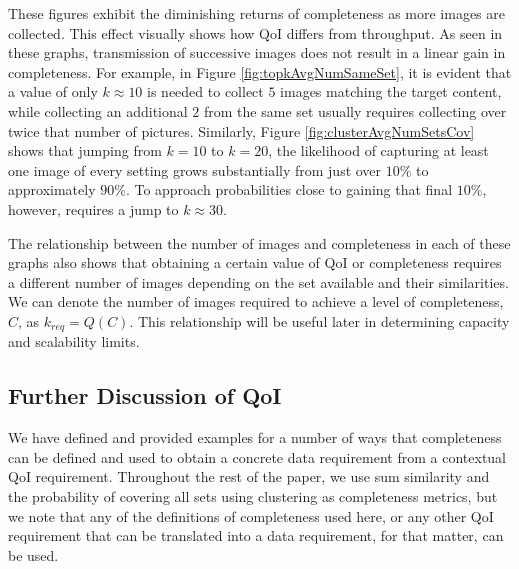These figures exhibit the diminishing returns of completeness as more images are collected.  This effect visually shows how QoI differs from throughput.  As seen in these graphs, transmission of successive images does not result in a linear gain in completeness.  For example, in Figure \ref{fig:topkAvgNumSameSet}, it is evident that a value of only $k \approx 10$ is needed to collect $5$ images matching the target content, while collecting an additional $2$ from the same set usually requires collecting over twice that number of pictures.  
Similarly, Figure \ref{fig:clusterAvgNumSetsCov} shows that jumping from $k=10$ to $k=20$, the likelihood of capturing at least one image of every setting grows substantially from just over $10\%$ to approximately $90\%$.  To approach probabilities close to gaining that final $10\%$, however, requires a jump to $k\approx30$.  

The relationship between the number of images and completeness in each of these graphs also shows that obtaining a certain value of QoI or completeness requires a different number of images depending on the set available and their similarities.  We can denote the number of images required to achieve a level of completeness, $C$, as $k_{req} = Q(C)$.  This relationship will be useful later in determining capacity and scalability limits.

\subsection{Further Discussion of QoI}
We have defined and provided examples for a number of ways that completeness can be defined and used to obtain a concrete data requirement from a contextual QoI requirement.  Throughout the rest of the paper, we use sum similarity and the probability of covering all sets using clustering as completeness metrics, but we note that any of the definitions of completeness used here, or any other QoI requirement that can be translated into a data requirement, for that matter, can be used. 




